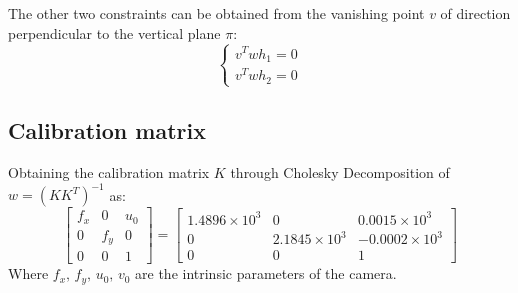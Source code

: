 The other two constraints can be obtained from the vanishing point $v$ of direction perpendicular to the vertical plane $\pi$:
\begin{equation}
    \begin{cases}
        v^Twh_1 = 0 \\
        v^Twh_2 = 0    
    \end{cases}
\end{equation}

\subsection{Calibration matrix}
Obtaining the calibration matrix $K$ through Cholesky Decomposition of $w=(KK^T)^{-1}$ as:
\begin{equation} \label{eq:calibrationMatrix}
    \begin{bmatrix}
        f_x & 0 & u_0 \\
        0 & f_y & 0 \\
        0 & 0 & 1
    \end{bmatrix}
    =
    \begin{bmatrix}
        1.4896 \times 10^{3} & 0 & 0.0015 \times 10^{3} \\
        0 & 2.1845 \times 10^{3} & -0.0002 \times 10^{3} \\
        0 & 0 & 1
    \end{bmatrix}
\end{equation}
Where $f_x, \, f_y, \, u_0,\, v_0$ are the intrinsic parameters of the camera.
